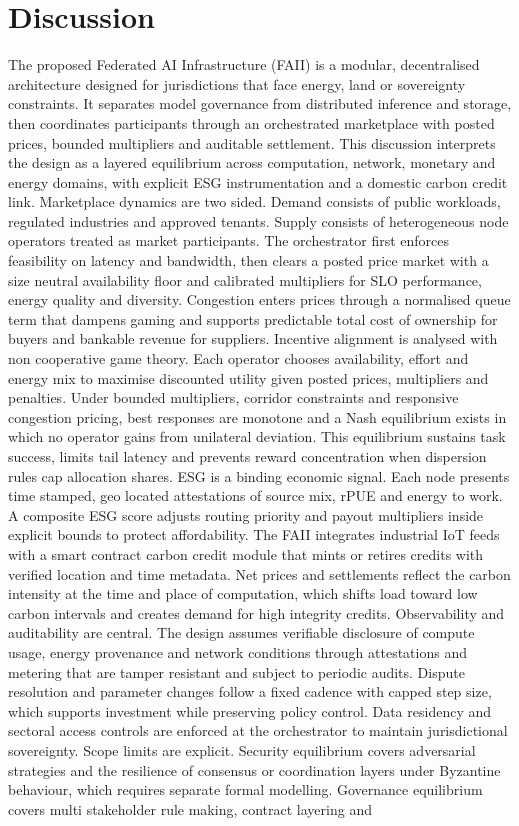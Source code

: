 \documentclass[oneside,10pt]{swissi}
\begin{document}
\section{Discussion}

The proposed Federated AI Infrastructure (FAII) is a modular, decentralised architecture designed for jurisdictions that face energy, land or sovereignty constraints. It separates model governance from distributed inference and storage, then coordinates participants through an orchestrated marketplace with posted prices, bounded multipliers and auditable settlement. This discussion interprets the design as a layered equilibrium across computation, network, monetary and energy domains, with explicit ESG instrumentation and a domestic carbon credit link. Marketplace dynamics are two sided. Demand consists of public workloads, regulated industries and approved tenants. Supply consists of heterogeneous node operators treated as market participants. The orchestrator first enforces feasibility on latency and bandwidth, then clears a posted price market with a size neutral availability floor and calibrated multipliers for SLO performance, energy quality and diversity. Congestion enters prices through a normalised queue term that dampens gaming and supports predictable total cost of ownership for buyers and bankable revenue for suppliers. Incentive alignment is analysed with non cooperative game theory. Each operator chooses availability, effort and energy mix to maximise discounted utility given posted prices, multipliers and penalties. Under bounded multipliers, corridor constraints and responsive congestion pricing, best responses are monotone and a Nash equilibrium exists in which no operator gains from unilateral deviation. This equilibrium sustains task success, limits tail latency and prevents reward concentration when dispersion rules cap allocation shares. ESG is a binding economic signal. Each node presents time stamped, geo located attestations of source mix, rPUE and energy to work. A composite ESG score adjusts routing priority and payout multipliers inside explicit bounds to protect affordability. The FAII integrates industrial IoT feeds with a smart contract carbon credit module that mints or retires credits with verified location and time metadata. Net prices and settlements reflect the carbon intensity at the time and place of computation, which shifts load toward low carbon intervals and creates demand for high integrity credits. Observability and auditability are central. The design assumes verifiable disclosure of compute usage, energy provenance and network conditions through attestations and metering that are tamper resistant and subject to periodic audits. Dispute resolution and parameter changes follow a fixed cadence with capped step size, which supports investment while preserving policy control. Data residency and sectoral access controls are enforced at the orchestrator to maintain jurisdictional sovereignty. Scope limits are explicit. Security equilibrium covers adversarial strategies and the resilience of consensus or coordination layers under Byzantine behaviour, which requires separate formal modelling. Governance equilibrium covers multi stakeholder rule making, contract layering and 
\end{document}
